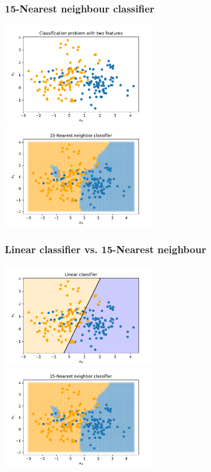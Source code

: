 \documentclass[notes]{beamer}          %
\begin{document}
\begin{frame}
\frametitle{15-Nearest neighbour classifier}
    \begin{center}
        \includegraphics[width=0.5\textwidth]{figures/week_1/classification_problem.pdf}
        \hfill
        \includegraphics[width=0.5\textwidth]{figures/week_1/15-nn.pdf}
    \end{center}
\end{frame}

\begin{frame}
\frametitle{Linear classifier vs. 15-Nearest neighbour}
    \begin{center}
        \includegraphics[width=0.5\textwidth]{figures/week_1/linear_model.pdf}
        \hfill
        \includegraphics[width=0.5\textwidth]{figures/week_1/15-nn.pdf}
    \end{center}
\end{frame}
\end{document}
